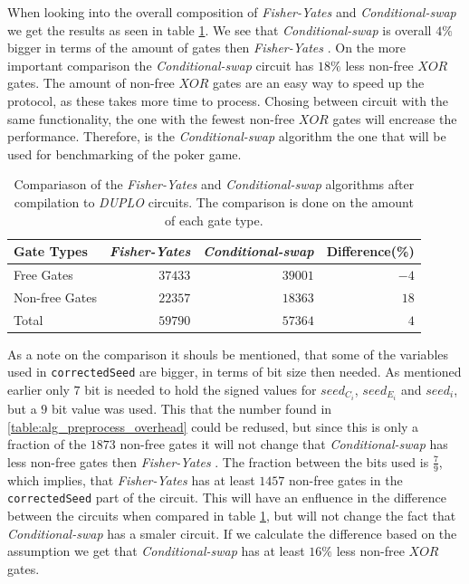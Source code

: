\documentclass[twoside,11pt,openright]{report}
\newcommand{\FY}{\textit{Fisher-Yates} }
\newcommand{\CS}{\textit{Conditional-swap} }
\newcommand{\DUPLO}{\textit{DUPLO} }
\begin{document}
When looking into the overall composition of \FY and \CS we get the results as seen in table \ref{table:circuit_comp}. We see that \CS is overall $4\%$ bigger in terms of the amount of gates then \FY. On the more important comparison the \CS circuit has $18\%$ less non-free $XOR$ gates. The amount of non-free $XOR$ gates are an easy way to speed up the protocol, as these takes more time to process. Chosing between circuit with the same functionality, the one with the fewest non-free $XOR$ gates will encrease the performance. Therefore, is the \CS algorithm the one that will be used for benchmarking of the poker game.

\begin{table}[t]
\centering
\begin{tabular}{l || r | r | r}
Gate Types     & \FY     & \CS     & Difference(\%) \\
\hline
Free Gates     & $37433$ & $39001$ & $-4$   \\
Non-free Gates & $22357$ & $18363$ & $18$   \\
\hline
Total          & $59790$ & $57364$ &  $4$
\end{tabular}
\caption{Compariason of the \FY and \CS algorithms after compilation to \DUPLO circuits. The comparison is done on the amount of each gate type.}
\label{table:circuit_comp}
\end{table}

\bigskip

As a note on the comparison it shouls be mentioned, that some of the variables used in \verb|correctedSeed| are bigger, in terms of bit size then needed. As mentioned earlier only $7$ bit is needed to hold the signed values for $seed_{C_i}$, $seed_{E_i}$ and $seed_i$, but a $9$ bit value was used. This that the number found in \ref{table:alg_preprocess_overhead} could be redused, but since this is only a fraction of  the $1873$ non-free gates it will not change that \CS has less non-free gates then \FY. The fraction between the bits used is $\frac{7}{9}$, which implies, that \FY has at least $1457$ non-free gates in the \verb|correctedSeed| part of the circuit. This will have an enfluence in the difference between the circuits when compared in table \ref{table:circuit_comp}, but will not change the fact that \CS has a smaler circuit. If we calculate the difference based on the assumption we get that \CS has at least $16\%$ less non-free $XOR$ gates.

\bigskip
\end{document}
